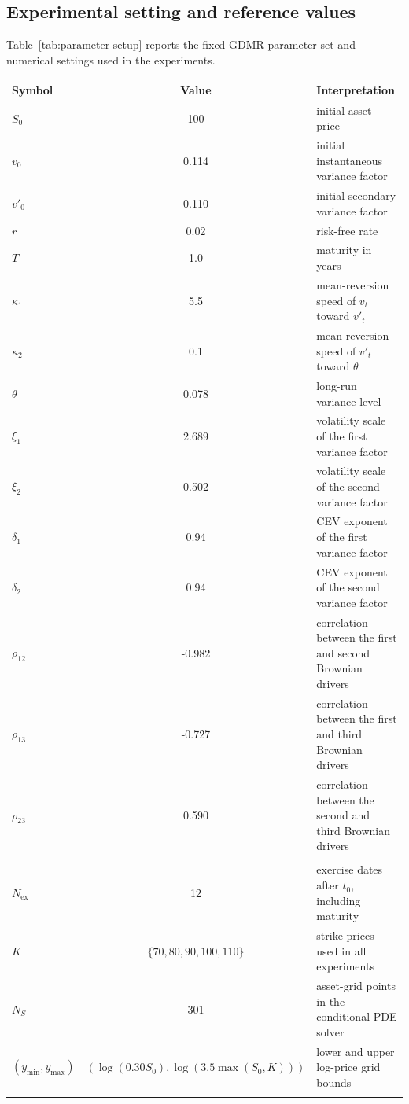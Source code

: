 \documentclass[pdflatex,sn-mathphys-num]{sn-jnl}
\makeatletter
\theoremstyle{thmstyleone}%
\theoremstyle{thmstylethree}%
\theoremstyle{thmstyletwo}%
\renewenvironment{table}[1][]{%
  \par\addvspace{12pt}%
  \noindent\begin{minipage}{\textwidth}%
  \def\@captype{table}%
  \centering%
  \tablebodyfont%
}{%
  \end{minipage}%
  \par\addvspace{12pt}%
}
\makeatother
\begin{document}

\subsection{Experimental setting and reference values}

Table~\ref{tab:parameter-setup} reports the fixed GDMR parameter set and
numerical settings used in the experiments.
\begin{table}[htbp]
\centering
\caption{Parameter set and numerical settings used in the pricing experiments.}
\label{tab:parameter-setup}
\begin{threeparttable}
\small
\begin{tabularx}{0.94\textwidth}{@{}l c X@{}}
\toprule
Symbol & Value & Interpretation \\
\midrule
$S_0$ & 100 & initial asset price \\
$v_0$ & 0.114 & initial instantaneous variance factor \\
$v'_0$ & 0.110 & initial secondary variance factor \\
$r$ & 0.02 & risk-free rate \\
$T$ & 1.0 & maturity in years \\
$\kappa_1$ & 5.5 & mean-reversion speed of $v_t$ toward $v'_t$ \\
$\kappa_2$ & 0.1 & mean-reversion speed of $v'_t$ toward $\theta$ \\
$\theta$ & 0.078 & long-run variance level \\
$\xi_1$ & 2.689 & volatility scale of the first variance factor \\
$\xi_2$ & 0.502 & volatility scale of the second variance factor \\
$\delta_1$ & 0.94 & CEV exponent of the first variance factor \\
$\delta_2$ & 0.94 & CEV exponent of the second variance factor \\
$\rho_{12}$ & -0.982 & correlation between the first and second Brownian drivers \\
$\rho_{13}$ & -0.727 & correlation between the first and third Brownian drivers \\
$\rho_{23}$ & 0.590 & correlation between the second and third Brownian drivers \\
\addlinespace
\multicolumn{3}{@{}l}{\textit{Fixed numerical setting}} \\
$N_{\mathrm{ex}}$ & 12 &  exercise dates after $t_0$, including maturity \\
$K$ & $\{70,80,90,100,110\}$ & strike prices used in all experiments \\
$N_S$ & 301 & asset-grid points in the conditional PDE solver \\
$(y_{\min},y_{\max})$ & $(\log (0.30S_0),\log(3.5\max \left(S_0, K\right)))$ & lower and upper log-price grid bounds \\
\botrule
\end{tabularx}
\end{threeparttable}
\end{table}
\end{document}
